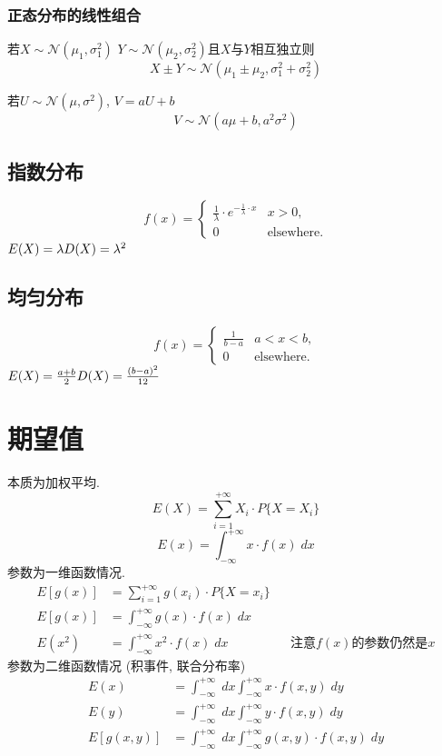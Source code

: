 \documentclass[a4paper]{report}
\begin{document}
\subsubsection{正态分布的线性组合}
若$X\sim \mathcal{N}(\mu_1,\sigma_1^2)$ $Y\sim \mathcal{N}(\mu_2,\sigma_2^2)$且$X$与$Y$相互独立则
$$X\pm Y\sim \mathcal{N}(\mu_1\pm \mu_2,\sigma_1^2+\sigma_2^2)$$
\par 若$U\sim \mathcal{N}(\mu,\sigma^2)$, $V=aU+b$
$$V\sim \mathcal{N} (a\mu+b,a^2\sigma^2)$$
\subsection{指数分布}
$$f(x)=\begin{cases}
  \frac{1}{\lambda}\cdot e^{-\frac{1}{\lambda}\cdot x}&x>0,\\
  0&\text{elsewhere.}
\end{cases}$$
$E(X)=\lambda \\ D(X)=\lambda^2$
\subsection{均匀分布}
$$f(x)=\begin{cases}
  \frac{1}{b-a}&a<x<b,\\
  0&\text{elsewhere.}
\end{cases}$$
$E(X)=\frac{a+b}{2}\\D(X)=\frac{(b-a)^2}{12}$
\section{期望值}
本质为加权平均. 
$$E(X)=\sum_{i=1}^{+\infty}X_i\cdot P \{X=X_i\} $$
$$E(x)=\int_{-\infty}^{+\infty}x\cdot f(x)\;dx$$
参数为一维函数情况. 
\begin{align*}
  E[g(x)]&=\sum_{i=1}^{+\infty}g(x_i)\cdot P \{X=x_i\}\\
  E[g(x)]&=\int_{-\infty}^{+\infty}g(x)\cdot f(x)\;dx\\
  E(x^2)&=\int_{-\infty}^{+\infty}x^2\cdot f(x)\;dx &&\text{注意$f(x)$的参数仍然是$x$}
\end{align*}
参数为二维函数情况 (积事件, 联合分布率)
\begin{align*}
  E(x)&=\int_{-\infty}^{+\infty}\;dx\int_{-\infty}^{+\infty}x\cdot f(x,y)\;dy\\
  E(y)&=\int_{-\infty}^{+\infty}\;dx\int_{-\infty}^{+\infty}y\cdot f(x,y)\;dy\\
  E[g(x,y)]&=\int_{-\infty}^{+\infty}\;dx\int_{-\infty}^{+\infty}g(x,y)\cdot f(x,y)\;dy\\
\end{align*}
\end{document}
